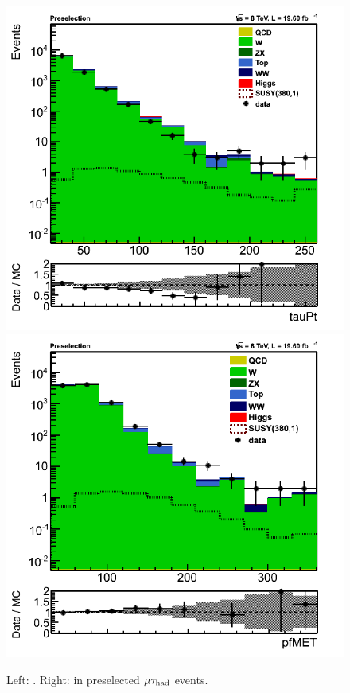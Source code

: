 \begin{figure}[htbp]
\centering
\includegraphics[angle=0,scale=0.35]{SelectionMuTau/tauPt_muTau.png}
\includegraphics[angle=0,scale=0.35]{SelectionMuTau/pfMET_muTau.png}
\caption{Left: \Tau\PT. Right: \MET in preselected $\mu\tau_{\rm had}$ events.}
\label{fig:datamcmuotau}
\end{figure}

